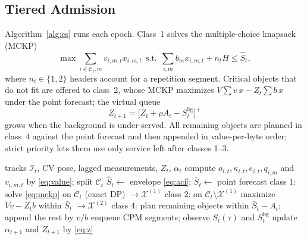 \documentclass[journal]{IEEEtran}
\theoremstyle{remark}
\newcommand{\cs}{\textsc{CertiSched}}
\begin{document}
\subsection{Tiered Admission}
Algorithm~\ref{alg:cs} runs each epoch. Class~1 solves the multiple-choice knapsack (MCKP)
\begin{equation}
\max \sum_{i\in\mathcal C_t,m}v_{i,m,t}x_{i,m,t}\ \ \text{s.t.}\ \ \sum_{i,m}b_mx_{i,m,t}+n_tH\le\hat S_t, \label{eq:mckp}
\end{equation}
where $n_t\in\{1,2\}$ headers account for a repetition segment. Critical objects that do not fit are offered to class~2, whose MCKP maximizes $V\sum v\,x-Z_t\sum b\,x$ under the point forecast; the virtual queue
\begin{equation}
Z_{t+1}=\big[Z_t+\rho A_t-S^{\mathrm{bg}}_t\big]^+ \label{eq:z}
\end{equation}
grows when the background is under-served. All remaining objects are planned in class~4 against the point forecast and then appended in value-per-byte order; strict priority lets them use only service left after classes 1--3.

\begin{algorithm}[t]
\caption{\cs{} decision at epoch $t$}\label{alg:cs}
\begin{algorithmic}[1]
\Require tracks $\mathcal I_t$, CV pose, lagged measurements, $Z_t$, $\alpha_t$
\State compute $o_{i,t},\kappa_{i,t},e_{i,t},q_{i,m}$ and $v_{i,m,t}$ by \eqref{eq:value}; split $\mathcal C_t$
\State $\hat S_t\gets$ envelope \eqref{eq:aci}; $\bar S_t\gets$ point forecast
\State class 1: solve \eqref{eq:mckp} on $\mathcal C_t$ (exact DP) $\to\mathcal X^{(1)}$
\State class 2: on $\mathcal C_t\setminus\mathcal X^{(1)}$ maximize $V v-Z_tb$ within $\bar S_t$ $\to\mathcal X^{(2)}$
\State class 4: plan remaining objects within $\bar S_t-A_t$; append the rest by $v/b$
\State enqueue CPM segments; observe $S_t(\tau)$ and $S^{\mathrm{bg}}_t$
\State update $\alpha_{t+1}$ and $Z_{t+1}$ by \eqref{eq:z}
\end{algorithmic}
\end{algorithm}
\end{document}
